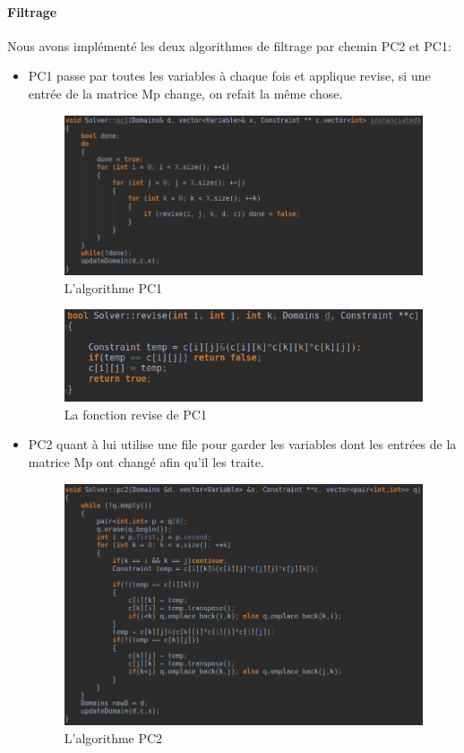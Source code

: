 \documentclass[12pt]{report}
\begin{document}
\paragraph{Filtrage}
Nous avons implémenté les deux algorithmes de filtrage par chemin PC2 et PC1:
\begin{itemize}
	\item PC1 passe par toutes les variables à chaque fois et applique revise, si une entrée de la matrice Mp change, on refait la même chose.
	\begin{figure}[H]
		\centering
		\includegraphics[scale=0.55]{imgs/pc1.png}
		\caption{L'algorithme PC1}
		\label{fig:PC1}
	\end{figure}
	\begin{figure}[H]
		\centering
		\includegraphics[scale=0.7]{imgs/revise.png}
		\caption{La fonction revise de PC1}
		\label{fig:Revise}
	\end{figure}
	\item PC2 quant à lui utilise une file pour garder les variables dont les entrées de la matrice Mp ont changé afin qu’il les traite.
	\begin{figure}[H]
		\centering
		\includegraphics[scale=0.55]{imgs/pc2.png}
		\caption{L'algorithme PC2}
		\label{fig:PC2}
	\end{figure}
\end{itemize}
\end{document}
